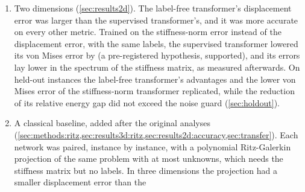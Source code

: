 \begin{enumerate}
the run, not a pre-registered criterion. Every network supervised on the displacement error
returned some predictions worse than the zero field; the label-free network returned none,
averaged over each instance's load cases, and \numThreeFreeLoadWorse{} in
\numThreeFreeLoads{} load cases taken singly. These three findings replicated on
\numHoldThreeN{} held-out instances under criteria fixed before the evaluation, for the
networks whose weights were stored, all but the supervised transformer with the energy term
(\cref{sec:holdout}). Trained on the stiffness-norm error of the same solutions, the
supervised transformer lowered its median relative energy gap by \numKdGapRel{} and its
median von Mises error by \numKdVmRel{}, as two pre-registered hypotheses predicted; their
statistic, the seeds' medians, was chosen after the per-instance values of the networks
compared were known. Descriptively, the change of norm more than closed the supervised
transformer's gap to the label-free transformer in these two errors (\numKdClosureGap{} and
\numKdClosureVm{} of it), and the retrained transformer's median relative energy gap fell
\numKdFreeRel{} below the label-free transformer's, a pre-registered reading beyond the
noise guard whose Welch 95\% interval over the three seeds, \numKdFreeWelchLow{} to
\numKdFreeWelchHigh{}, includes zero.
\item Two dimensions (\cref{sec:results2d}). The label-free transformer's displacement error
was \numCmFreeDispExcessAbs{} larger than the supervised transformer's, and it was more
accurate on every other metric. Trained on the stiffness-norm error instead of the
displacement error, with the same labels, the supervised transformer lowered its von Mises
error by \numHTwoBRel{} (a pre-registered hypothesis, supported), and its errors lay lower
in the spectrum of the stiffness matrix, as measured afterwards. On \numHoldTwoN{} held-out
instances the label-free transformer's advantages and the lower von Mises error of the
stiffness-norm transformer replicated, while the reduction of its relative energy gap did
not exceed the noise guard (\cref{sec:holdout}).
\item A classical baseline, added after the original analyses
(\cref{sec:methods:ritz,sec:results3d:ritz,sec:results2d:accuracy,sec:transfer}). Each
network was paired, instance by instance, with a polynomial Ritz-Galerkin projection of the
same problem with at most \numRitzThreeKMax{} unknowns, which needs the stiffness matrix but
no labels. In three dimensions the projection had a smaller displacement error than the

\end{enumerate}

